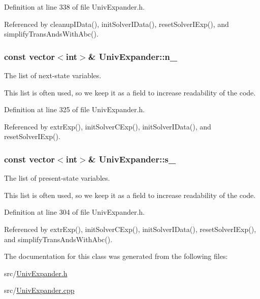 Definition at line 338 of file Univ\-Expander.\-h.



Referenced by cleanup\-I\-Data(), init\-Solver\-I\-Data(), reset\-Solver\-I\-Exp(), and simplify\-Trans\-Ands\-With\-Abc().

\hypertarget{classUnivExpander_a053df0842220ee9fa6b5ab41a2e10253}{
\subsubsection[{n\-\_\-}]{\setlength{\rightskip}{0pt plus 5cm}const vector$<$int$>$\& Univ\-Expander\-::n\-\_\-\hspace{0.3cm}{\ttfamily [protected]}}}\label{classUnivExpander_a053df0842220ee9fa6b5ab41a2e10253}


The list of next-\/state variables. 

This list is often used, so we keep it as a field to increase readability of the code. 

Definition at line 325 of file Univ\-Expander.\-h.



Referenced by extr\-Exp(), init\-Solver\-C\-Exp(), init\-Solver\-I\-Data(), and reset\-Solver\-I\-Exp().

\hypertarget{classUnivExpander_a65c8d362518dae708b16a4f214511306}{
\subsubsection[{s\-\_\-}]{\setlength{\rightskip}{0pt plus 5cm}const vector$<$int$>$\& Univ\-Expander\-::s\-\_\-\hspace{0.3cm}{\ttfamily [protected]}}}\label{classUnivExpander_a65c8d362518dae708b16a4f214511306}


The list of present-\/state variables. 

This list is often used, so we keep it as a field to increase readability of the code. 

Definition at line 304 of file Univ\-Expander.\-h.



Referenced by extr\-Exp(), init\-Solver\-C\-Exp(), init\-Solver\-I\-Data(), reset\-Solver\-I\-Exp(), and simplify\-Trans\-Ands\-With\-Abc().



The documentation for this class was generated from the following files\-:\begin{DoxyCompactItemize}
\item 
src/\hyperlink{UnivExpander_8h}{Univ\-Expander.\-h}\item 
src/\hyperlink{UnivExpander_8cpp}{Univ\-Expander.\-cpp}\end{DoxyCompactItemize}
